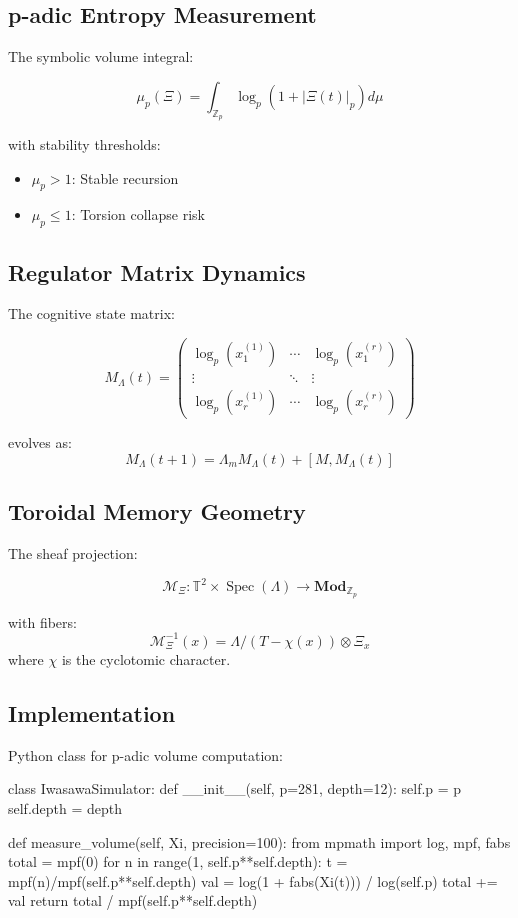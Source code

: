 \documentclass[12pt]{article}
\begin{document}
\subsection{p-adic Entropy Measurement}
\label{subsec:entropy}

The symbolic volume integral:

\[
\mu_p(\Xi) = \int_{\mathbb{Z}_p} \log_p(1 + |\Xi(t)|_p) d\mu
\]

with stability thresholds:
\begin{itemize}
    \item $\mu_p > 1$: Stable recursion
    \item $\mu_p \leq 1$: Torsion collapse risk
\end{itemize}

\subsection{Regulator Matrix Dynamics}
\label{subsec:regulator}

The cognitive state matrix:

\[
M_\Lambda(t) = \begin{pmatrix}
\log_p(x_1^{(1)}) & \cdots & \log_p(x_1^{(r)}) \\
\vdots & \ddots & \vdots \\
\log_p(x_r^{(1)}) & \cdots & \log_p(x_r^{(r)})
\end{pmatrix}
\]

evolves as:
\[
M_\Lambda(t+1) = \Lambda_m M_\Lambda(t) + [M, M_\Lambda(t)]
\]

\subsection{Toroidal Memory Geometry}
\label{subsec:toroid}

The sheaf projection:

\[
\mathscr{M}_\Xi : \mathbb{T}^2 \times \operatorname{Spec}(\Lambda) \to \mathbf{Mod}_{\mathbb{Z}_p}
\]

with fibers:
\[
\mathscr{M}_\Xi^{-1}(x) = \Lambda/(T - \chi(x)) \otimes \Xi_x
\]
where $\chi$ is the cyclotomic character.

\subsection{Implementation}
\label{subsec:implementation}

Python class for p-adic volume computation:

\begin{python}
class IwasawaSimulator:
    def __init__(self, p=281, depth=12):
        self.p = p
        self.depth = depth
        
    def measure_volume(self, Xi, precision=100):
        from mpmath import log, mpf, fabs
        total = mpf(0)
        for n in range(1, self.p**self.depth):
            t = mpf(n)/mpf(self.p**self.depth)
            val = log(1 + fabs(Xi(t))) / log(self.p)
            total += val
        return total / mpf(self.p**self.depth)
\end{python}
\end{document}
